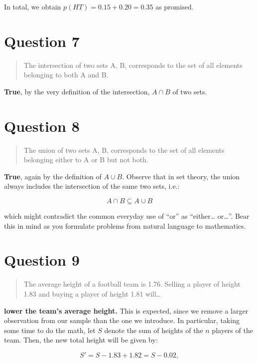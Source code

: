 \documentclass[
]{article}
\begin{document}
In total, we obtain \(p(HT)=0.15+0.20=0.35\) as promised.

\section{Question 7}\label{question-7}

\begin{quote}
The intersection of two sets A, B, corresponds to the set of all
elements belonging to both A and B.
\end{quote}

\textbf{True}, by the very definition of the intersection, \(A\cap B\)
of two sets.

\section{Question 8}\label{question-8}

\begin{quote}
The union of two sets A, B, corresponds to the set of all elements
belonging either to A or B but not both.
\end{quote}

\textbf{True}, again by the definition of \(A\cup B\). Observe that in
set theory, the union always includes the intersection of the same two
sets, i.e.:

\[A\cap B\subseteq A\cup B\]

which might contradict the common everyday use of ``or'' as
``either\ldots{} or\ldots{}''. Bear this in mind as you formulate
problems from natural language to mathematics.

\section{Question 9}\label{question-9}

\begin{quote}
The average height of a football team is 1.76. Selling a player of
height 1.83 and buying a player of height 1.81 will\ldots{}
\end{quote}

\textbf{lower the team's average height.} This is expected, since we
remove a larger observation from our sample than the one we introduce.
In particular, taking some time to do the math, let \(S\) denote the sum
of heights of the \(n\) players of the team. Then, the new total height
will be given by:

\[S'=S-1.83+1.82=S-0.02,\]
\end{document}

